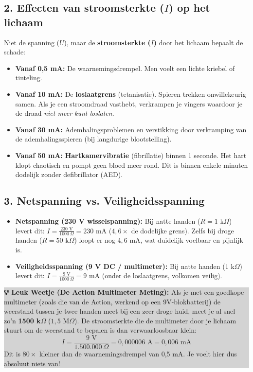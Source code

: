 \documentclass[a4paper, 11pt]{article}
\begin{document}
\subsection{2. Effecten van stroomsterkte ($I$) op het lichaam}
Niet de spanning ($U$), maar de \textbf{stroomsterkte ($I$)} door het lichaam bepaalt de schade:
\begin{itemize}
    \item \textbf{Vanaf 0,5 mA:} De waarnemingsdrempel. Men voelt een lichte kriebel of tinteling.
    \item \textbf{Vanaf 10 mA:} De \textbf{loslaatgrens} (tetanisatie). Spieren trekken onwillekeurig samen. Als je een stroomdraad vasthebt, verkrampen je vingers waardoor je de draad \textit{niet meer kunt loslaten}.
    \item \textbf{Vanaf 30 mA:} Ademhalingsproblemen en verstikking door verkramping van de ademhalingsspieren (bij langdurige blootstelling).
    \item \textbf{Vanaf 50 mA:} \textbf{Hartkamervibratie} (fibrillatie) binnen 1 seconde. Het hart klopt chaotisch en pompt geen bloed meer rond. Dit is binnen enkele minuten dodelijk zonder defibrillator (AED).
\end{itemize}

\subsection{3. Netspanning vs. Veiligheidsspanning}
\begin{itemize}
    \item \textbf{Netspanning (230 V wisselspanning):} 
    Bij natte handen ($R = 1\text{ k}\Omega$) levert dit: $I = \frac{230\text{ V}}{1000\ \Omega} = 230\text{ mA}$ ($4,6 \times$ de dodelijke grens). Zelfs bij droge handen ($R = 50\text{ k}\Omega$) loopt er nog $4,6\text{ mA}$, wat duidelijk voelbaar en pijnlijk is.
    \item \textbf{Veiligheidsspanning (9 V DC / multimeter):} 
    Bij natte handen ($1\text{ k}\Omega$) levert dit: $I = \frac{9\text{ V}}{1000\ \Omega} = 9\text{ mA}$ (onder de loslaatgrens, volkomen veilig). 
\end{itemize}

\noindent\colorbox{lightgrey}{
\begin{minipage}{0.96\textwidth}
    \small \textbf{💡 Leuk Weetje (De Action Multimeter Meting):} 
    Als je met een goedkope multimeter (zoals die van de Action, werkend op een 9V-blokbatterij) de weerstand tussen je twee handen meet bij een zeer droge huid, meet je al snel zo'n \textbf{1500 k$\Omega$} ($1,5\text{ M}\Omega$). 
    De stroomsterkte die de multimeter door je lichaam stuurt om de weerstand te bepalen is dan verwaarloosbaar klein:
    \[ I = \frac{9\text{ V}}{1.500.000\ \Omega} = 0,000006\text{ A} = 0,006\text{ mA} \]
    Dit is $80\times$ kleiner dan de waarnemingsdrempel van 0,5 mA. Je voelt hier dus absoluut niets van!
\end{minipage}
}
\end{document}
